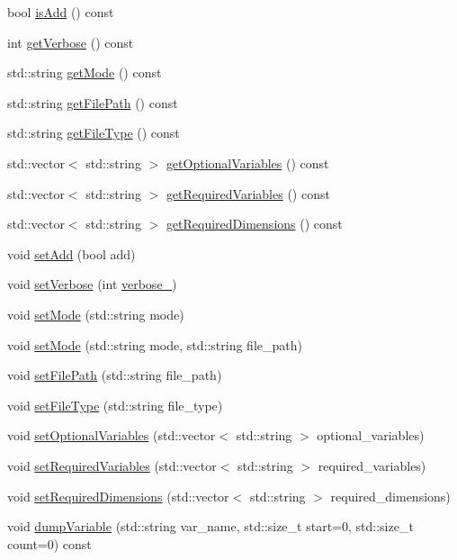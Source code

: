 \begin{DoxyCompactItemize}
\item 
bool \mbox{\hyperlink{class_an_en_i_o_a0cd2479fe69440fb8643b7b5e84e06b1}{is\+Add}} () const
\item 
int \mbox{\hyperlink{class_an_en_i_o_a0bf0dab5e393c5597f97ab38c910e24d}{get\+Verbose}} () const
\item 
std\+::string \mbox{\hyperlink{class_an_en_i_o_a85d6f6dbf12ba5250ebc93065b7cb50c}{get\+Mode}} () const
\item 
std\+::string \mbox{\hyperlink{class_an_en_i_o_aae00624f6127c7946496443f5322ec8e}{get\+File\+Path}} () const
\item 
std\+::string \mbox{\hyperlink{class_an_en_i_o_a6f51b190d64895a4ad907abcf4a10b75}{get\+File\+Type}} () const
\item 
std\+::vector$<$ std\+::string $>$ \mbox{\hyperlink{class_an_en_i_o_a50997e1baef5b8bb18d833c8c875a7bc}{get\+Optional\+Variables}} () const
\item 
std\+::vector$<$ std\+::string $>$ \mbox{\hyperlink{class_an_en_i_o_abd3cbf0e384dd9d610f985fb4131df9b}{get\+Required\+Variables}} () const
\item 
std\+::vector$<$ std\+::string $>$ \mbox{\hyperlink{class_an_en_i_o_a80e8d2bc7f90b24b93c560a24aeb126e}{get\+Required\+Dimensions}} () const
\item 
void \mbox{\hyperlink{class_an_en_i_o_ada3447ac52d460ae2cbc355dcd55bd35}{set\+Add}} (bool add)
\item 
void \mbox{\hyperlink{class_an_en_i_o_a696dff7bb250fc45b597e5f82e33e23e}{set\+Verbose}} (int \mbox{\hyperlink{class_an_en_i_o_a4f6abd007730e4a8f54d57cc3572bd9e}{verbose\+\_\+}})
\item 
void \mbox{\hyperlink{class_an_en_i_o_a0f3889bc1652077a4b41016393f0b7c6}{set\+Mode}} (std\+::string mode)
\item 
void \mbox{\hyperlink{class_an_en_i_o_aa199cf152c5c165e9c98d237830ba9ec}{set\+Mode}} (std\+::string mode, std\+::string file\+\_\+path)
\item 
void \mbox{\hyperlink{class_an_en_i_o_a98066d375cc78694fda2af1ce37cc8d8}{set\+File\+Path}} (std\+::string file\+\_\+path)
\item 
void \mbox{\hyperlink{class_an_en_i_o_a00fce5619b087353debcb2a602007f31}{set\+File\+Type}} (std\+::string file\+\_\+type)
\item 
void \mbox{\hyperlink{class_an_en_i_o_abc499df15eac5fa3f203267723f5edfa}{set\+Optional\+Variables}} (std\+::vector$<$ std\+::string $>$ optional\+\_\+variables)
\item 
void \mbox{\hyperlink{class_an_en_i_o_a643c51c346118d8416fa2c2e0da8042a}{set\+Required\+Variables}} (std\+::vector$<$ std\+::string $>$ required\+\_\+variables)
\item 
void \mbox{\hyperlink{class_an_en_i_o_a239ea94b3648006920bcdcded4040ad3}{set\+Required\+Dimensions}} (std\+::vector$<$ std\+::string $>$ required\+\_\+dimensions)
\item 
void \mbox{\hyperlink{class_an_en_i_o_acd5682e81361d75ff5566ae1df5fa023}{dump\+Variable}} (std\+::string var\+\_\+name, std\+::size\+\_\+t start=0, std\+::size\+\_\+t count=0) const
\end{DoxyCompactItemize}
